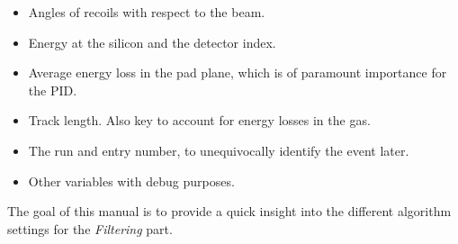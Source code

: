 \documentclass[11pt, a4paper, english]{article}
\begin{document}
\begin{enumerate}
\begin{itemize}
		\item Angles of recoils with respect to the beam. 
		\item Energy at the silicon and the detector index.
		\item Average energy loss in the pad plane, which is of paramount importance for the PID.
		\item Track length. Also key to account for energy losses in the gas.
		\item The run and entry number, to unequivocally identify the event later.
		\item Other variables with debug purposes. 
	\end{itemize}
\end{enumerate}


The goal of this manual is to provide a quick insight into the different algorithm settings for the \textit
{Filtering} part.
\end{document}
